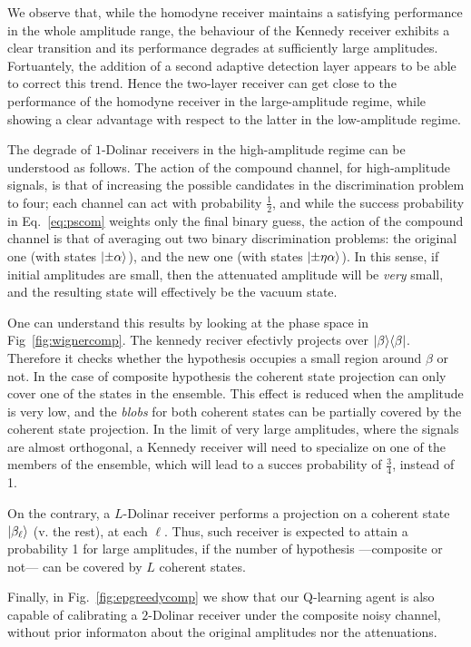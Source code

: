 We observe that, while the homodyne receiver maintains a satisfying performance in the whole amplitude range, the behaviour of the Kennedy receiver exhibits a clear transition and its performance degrades at sufficiently large amplitudes. Fortuantely, the addition of a second adaptive detection layer appears to be able to correct this trend. Hence the two-layer receiver can get close to the performance of the homodyne receiver in the large-amplitude regime, while showing a clear advantage with respect to the latter in the low-amplitude regime.

The degrade of $1$-Dolinar receivers in the high-amplitude regime can be understood as follows. The action of the compound channel, for high-amplitude signals, is that of increasing the possible candidates in the discrimination problem to four; each channel can act with probability $\frac{1}{2}$, and while the success probability in Eq.~\ref{eq:pscom} weights only the final binary guess, the action of the compound channel is that of averaging out two binary discrimination problems: the original one (with states $\ket{\pm \alpha}$), and the new one (with states $\ket{\pm \eta \alpha}$). In this sense, if initial amplitudes are small, then the attenuated amplitude will be \textit{very} small, and the resulting state will effectively be the vacuum state.

One can understand this results by looking at the phase space in Fig~\ref{fig:wignercomp}. The kennedy reciver efectivly projects over $\proj{\beta}$. Therefore it checks whether the hypothesis occupies a small region around $\beta$ or not. In the case of composite hypothesis the coherent state projection can only cover one of the states in the ensemble. This effect is reduced when the amplitude is very low, and the \textit{blobs} for both coherent states can be partially covered by the coherent state projection. In the limit of very large amplitudes, where the signals are almost orthogonal, a Kennedy receiver will need to specialize on one of the members of the ensemble, which will lead to a succes probability of $\frac{3}{4}$, instead of 1.

On the contrary, a $L$-Dolinar receiver performs a projection on a coherent state $\ket{\beta_\ell}$ (v. the rest), at each $\ell$. Thus, such receiver is expected to attain a probability 1 for large amplitudes, if the number of hypothesis ---composite or not--- can be covered by $L$ coherent states.

Finally, in Fig.~\ref{fig:epgreedycomp} we show that our Q-learning agent is also capable of calibrating a $2$-Dolinar receiver under the composite noisy channel, without prior informaton about the original amplitudes nor the attenuations.

